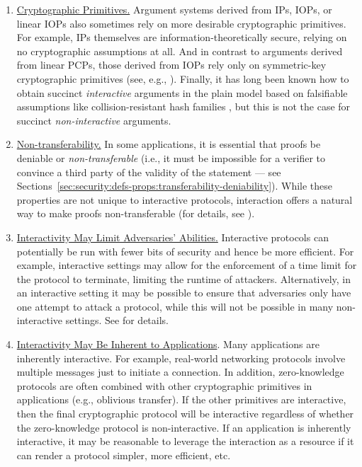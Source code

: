 \begin{enumerate}[label=\alph*.]
\item \underline{Cryptographic Primitives.} 
Argument systems derived from IPs, IOPs, or linear IOPs also sometimes rely on more desirable cryptographic primitives. For example, IPs themselves are information-theoretically secure, relying on no cryptographic assumptions at all. And
in contrast to arguments derived from linear PCPs, those derived from IOPs rely only on symmetric-key cryptographic primitives (see, e.g., \cite{2016:tcc:IOPs}).
Finally, it has long been known how to obtain succinct \emph{interactive} arguments in the plain model based on falsifiable assumptions like collision-resistant
hash families \cite{1995:crypto:Improved-Efficient-Arguments}, but this is not the case for succinct \emph{non-interactive} arguments.



\item \underline{Non-transferability.} 
In some applications, it is essential that proofs be deniable or \emph{non-transferable} (i.e., it must be impossible for a verifier to convince a third party of the validity of the statement --- see Sections~\ref{sec:security:defs-props:transferability-deniability}). 
While these properties are not unique to interactive protocols, interaction offers a natural way to make proofs non-transferable (for details, see  ). %


\item  \underline{Interactivity May Limit Adversaries' Abilities.}  
Interactive protocols can potentially be run with fewer bits of security and hence be more efficient. For example, interactive settings may allow
for the enforcement of a time limit for the protocol to terminate, limiting the runtime of attackers. Alternatively, 
in an interactive setting
it may be possible to ensure that adversaries only have one attempt to attack a protocol, 
while this will not be possible in many non-interactive settings. 
See  for details.


\item \underline{Interactivity May Be Inherent to Applications}. 
Many applications are inherently interactive. For example, real-world networking protocols involve multiple messages just to initiate a connection. In addition,
zero-knowledge protocols are often combined with other cryptographic primitives in applications (e.g., oblivious transfer). If the other primitives are interactive, then the final cryptographic protocol will be interactive regardless of whether the zero-knowledge protocol is non-interactive.
If an application is inherently interactive, it may be reasonable to leverage the interaction as a resource if it can render a protocol simpler, more efficient, etc. 

\end{enumerate}



